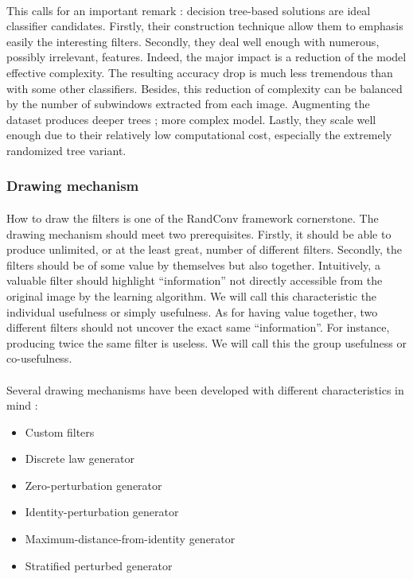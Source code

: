 \documentclass[a4paper]{report}
\begin{document}
		\paragraph{}
		This calls for an important remark : decision tree-based solutions are ideal classifier candidates. Firstly, their construction technique allow them to emphasis easily the interesting filters. Secondly, they deal well enough with numerous, possibly irrelevant, features. Indeed, the major impact is a reduction of the model effective complexity. The resulting accuracy drop is much less tremendous than with some other classifiers. Besides, this reduction of complexity can be balanced by the number of subwindows extracted from each image. Augmenting the dataset produces deeper trees ; more complex model. Lastly, they scale well enough due to their relatively low computational cost, especially the extremely randomized tree variant.
		
			
			
			\subsubsection{Drawing mechanism}
			\paragraph{}
			How to draw the filters is one of the RandConv framework cornerstone. The drawing mechanism should meet two prerequisites. Firstly, it should be able to produce unlimited, or at the least great, number of different filters. Secondly, the filters should be of some value by themselves but also together. Intuitively, a valuable filter should highlight ``information'' not directly accessible from the original image by the learning algorithm. We will call this characteristic the individual usefulness or simply usefulness. As for having value together, two different filters should not uncover the exact same ``information''. For instance, producing twice the same filter is useless. We will call this the group usefulness or co-usefulness.
			
			\paragraph{}
			Several drawing mechanisms have been developed with different characteristics in mind :
			
			\begin{itemize}
				\item Custom filters
				\item Discrete law generator
				\item Zero-perturbation generator
				\item Identity-perturbation generator
				\item Maximum-distance-from-identity generator
				\item Stratified perturbed generator
			\end{itemize}
			
\end{document}
